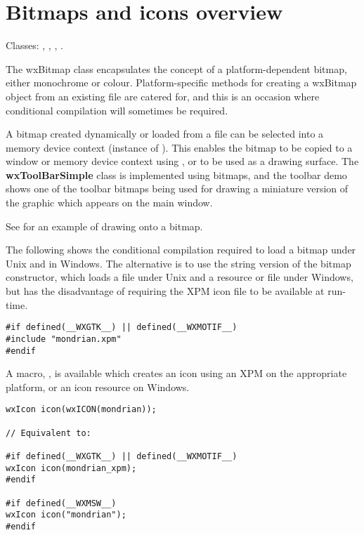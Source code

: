 \section{Bitmaps and icons overview}\label{wxbitmapoverview}

Classes: , , , .

The wxBitmap class encapsulates the concept of a platform-dependent bitmap,
either monochrome or colour. Platform-specific methods for creating a
wxBitmap object from an existing file are catered for, and
this is an occasion where conditional compilation will sometimes be
required.

A bitmap created dynamically or loaded from a file can be selected
into a memory device context (instance of ). This
enables the bitmap to be copied to a window or memory device context
using , or to be used as a drawing surface.  The {\bf
wxToolBarSimple} class is implemented using bitmaps, and the toolbar demo
shows one of the toolbar bitmaps being used for drawing a miniature
version of the graphic which appears on the main window.

See  for an example of drawing onto a bitmap.

The following shows the conditional compilation required to load a
bitmap under Unix and in Windows. The alternative is to use the string
version of the bitmap constructor, which loads a file under Unix and a
resource or file under Windows, but has the disadvantage of requiring the
XPM icon file to be available at run-time.

\begin{verbatim}
#if defined(__WXGTK__) || defined(__WXMOTIF__)
#include "mondrian.xpm"
#endif
\end{verbatim}

A macro, , is available which creates an icon using an XPM
on the appropriate platform, or an icon resource on Windows.

\begin{verbatim}
wxIcon icon(wxICON(mondrian));

// Equivalent to:

#if defined(__WXGTK__) || defined(__WXMOTIF__)
wxIcon icon(mondrian_xpm);
#endif

#if defined(__WXMSW__)
wxIcon icon("mondrian");
#endif
\end{verbatim}


